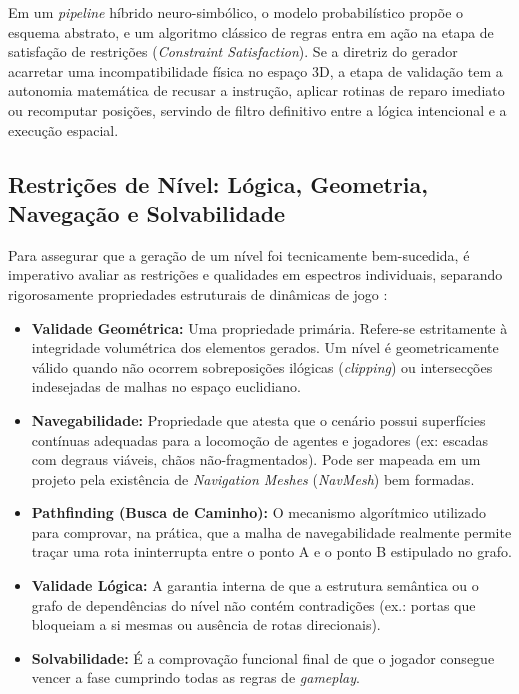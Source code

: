 Em um \textit{pipeline} híbrido neuro-simbólico, o modelo probabilístico propõe o esquema abstrato, e um algoritmo clássico de regras entra em ação na etapa de satisfação de restrições (\textit{Constraint Satisfaction}). Se a diretriz do gerador acarretar uma incompatibilidade física no espaço 3D, a etapa de validação tem a autonomia matemática de recusar a instrução, aplicar rotinas de reparo imediato ou recomputar posições, servindo de filtro definitivo entre a lógica intencional e a execução espacial.

\subsection{Restrições de Nível: Lógica, Geometria, Navegação e Solvabilidade}
\label{sec:validade}

Para assegurar que a geração de um nível foi tecnicamente bem-sucedida, é imperativo avaliar as restrições e qualidades em espectros individuais, separando rigorosamente propriedades estruturais de dinâmicas de jogo \cite{inproceedings, dormans2010}:

\begin{itemize}
    \item \textbf{Validade Geométrica:} Uma propriedade primária. Refere-se estritamente à integridade volumétrica dos elementos gerados. Um nível é geometricamente válido quando não ocorrem sobreposições ilógicas (\textit{clipping}) ou intersecções indesejadas de malhas no espaço euclidiano.
    
    \item \textbf{Navegabilidade:} Propriedade que atesta que o cenário possui superfícies contínuas adequadas para a locomoção de agentes e jogadores (ex: escadas com degraus viáveis, chãos não-fragmentados). Pode ser mapeada em um projeto pela existência de \textit{Navigation Meshes} (\textit{NavMesh}) bem formadas.
    
    \item \textbf{Pathfinding (Busca de Caminho):} O mecanismo algorítmico utilizado para comprovar, na prática, que a malha de navegabilidade realmente permite traçar uma rota ininterrupta entre o ponto A e o ponto B estipulado no grafo.
    
    \item \textbf{Validade Lógica:} A garantia interna de que a estrutura semântica ou o grafo de dependências do nível não contém contradições (ex.: portas que bloqueiam a si mesmas ou ausência de rotas direcionais).
    
    \item \textbf{Solvabilidade:} É a comprovação funcional final de que o jogador consegue vencer a fase cumprindo todas as regras de \textit{gameplay}. 
\end{itemize}

